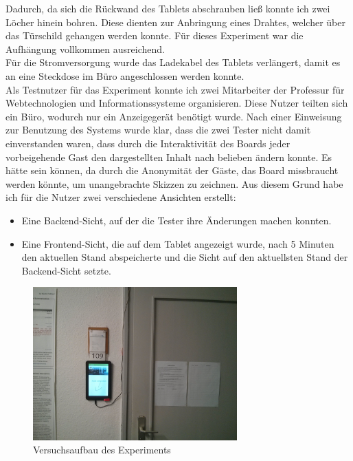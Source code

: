 Dadurch, da sich die Rückwand des Tablets abschrauben ließ konnte ich zwei Löcher hinein bohren. Diese dienten zur Anbringung eines Drahtes, welcher über das Türschild gehangen werden konnte. Für dieses Experiment war die Aufhängung vollkommen ausreichend.\\
Für die Stromversorgung wurde das Ladekabel des Tablets verlängert, damit es an eine Steckdose im Büro angeschlossen werden konnte.\\
Als Testnutzer für das Experiment konnte ich zwei Mitarbeiter der Professur für Webtechnologien und Informationssysteme organisieren.
Diese Nutzer teilten sich ein Büro, wodurch nur ein Anzeigegerät benötigt wurde. Nach einer Einweisung zur Benutzung des Systems wurde klar, dass die zwei Tester nicht damit einverstanden waren, dass durch die Interaktivität des Boards jeder vorbeigehende Gast den dargestellten Inhalt nach belieben ändern konnte. Es hätte sein können, da durch die Anonymität der Gäste, das Board missbraucht werden könnte, um unangebrachte Skizzen zu zeichnen.
Aus diesem Grund habe ich für die Nutzer zwei verschiedene Ansichten erstellt:
\begin{itemize}
  \item Eine Backend-Sicht, auf der die Tester ihre Änderungen machen konnten.
  \item Eine Frontend-Sicht, die auf dem Tablet angezeigt wurde, nach 5 Minuten den aktuellen Stand abspeicherte und die Sicht auf den aktuellsten Stand der Backend-Sicht setzte.
\end{itemize}
\begin{figure}[h!]
  \centering
    \includegraphics[width=0.7\textwidth]{./img/experiment01.jpg}
  \caption{Versuchsaufbau des Experiments}
  \label{img:experiment01}
\end{figure}



